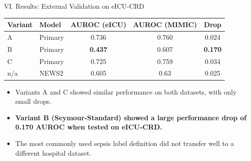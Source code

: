 \begin{frame}{VI. Results: External Validation on
              eICU-CRD~\cite{pollard2018eicu}}
\begin{center}\tablestyle
\begin{tabular}{llccc}
\toprule
\textbf{Variant} & \textbf{Model}
  & \textbf{AUROC (eICU)} & \textbf{AUROC (MIMIC)} & \textbf{Drop} \\
\midrule
A   & Primary & 0.736          & 0.760 & 0.024 \\
B   & Primary & \textbf{0.437} & 0.607 & \textbf{0.170} \\
C   & Primary & 0.725          & 0.759 & 0.034 \\
n/a & NEWS2   & 0.605          & 0.63  & 0.025 \\
\bottomrule
\end{tabular}
\end{center}

\vspace{6pt}
\begin{itemize}
  \item Variants A and C showed similar performance on both datasets, with
        only small drops.
  \item \textbf{Variant B (Seymour-Standard) showed a large performance drop
        of 0.170 AUROC when tested on eICU-CRD.}
  \item The most commonly used sepsis label definition did not transfer well
        to a different hospital dataset.
\end{itemize}
\end{frame}


